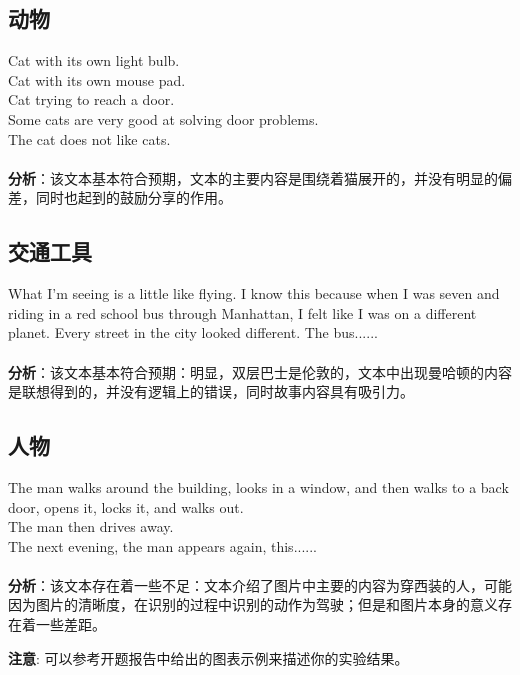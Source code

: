 \documentclass{article}
\begin{document}
\begin{CJK*}{UTF8}{gbsn}
\subsection{动物}

Cat with its own light bulb. \\

Cat with its own mouse pad. \\

Cat trying to reach a door. \\

Some cats are very good at solving door problems. \\

The cat does not like cats. \\
\\
\textbf{分析}：该文本基本符合预期，文本的主要内容是围绕着猫展开的，并没有明显的偏差，同时也起到的鼓励分享的作用。

\subsection{交通工具}

What I'm seeing is a little like flying. I know this because when I was seven and riding in a red school bus through Manhattan, I felt like I was on a different planet. Every street in the city looked different. The bus...... \\
\\
\textbf{分析}：该文本基本符合预期：明显，双层巴士是伦敦的，文本中出现曼哈顿的内容是联想得到的，并没有逻辑上的错误，同时故事内容具有吸引力。

\subsection{人物}

The man walks around the building, looks in a window, and then walks to a back door, opens it, locks it, and walks out. \\

The man then drives away. \\

The next evening, the man appears again, this...... \\
\\
\textbf{分析}：该文本存在着一些不足：文本介绍了图片中主要的内容为穿西装的人，可能因为图片的清晰度，在识别的过程中识别的动作为驾驶；但是和图片本身的意义存在着一些差距。

\textbf{注意}: 可以参考开题报告中给出的图表示例来描述你的实验结果。


\end{CJK*}
\end{document}
